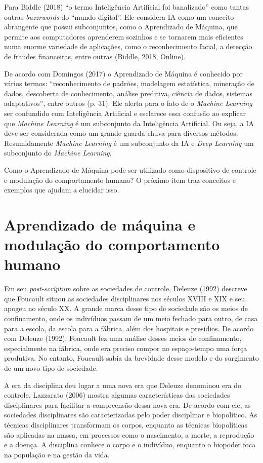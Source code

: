 Para Biddle (2018) ``o termo Inteligência Artificial foi banalizado''
como tantas outras \emph{buzzrwords} do ``mundo digital''. Ele considera
IA como um conceito abrangente que possui subconjuntos, como o
Aprendizado de Máquina, que permite aos computadores aprenderem sozinhos
e se tornarem mais eficientes numa enorme variedade de aplicações, como
o reconhecimento facial, a detecção de fraudes financeiras, entre outras
(Biddle, 2018, Online).

De acordo com Domingos (2017) o Aprendizado de Máquina é conhecido por
vários termos: ``reconhecimento de padrões, modelagem estatística,
mineração de dados, descoberta de conhecimento, análise preditiva,
ciência de dados, sistemas adaptativos'', entre outros (p. 31). Ele
alerta para o fato de o \emph{Machine Learning} ser confundido com
Inteligência Artificial e esclarece essa confusão ao explicar que
\emph{Machine Learning} é um subconjunto da Inteligência Artificial. Ou
seja, a IA deve ser considerada como um grande guarda-chuva para
diversos métodos. Resumidamente \emph{Machine Learning} é um subconjunto
da IA e \emph{Deep Learning} um subconjunto do \emph{Machine Learning}.

Como o Aprendizado de Máquina pode ser utilizado como dispositivo de
controle e modulação do comportamento humano? O próximo item traz
conceitos e exemplos que ajudam a elucidar isso.

\section{Aprendizado de máquina e modulação do comportamento humano}

Em seu \emph{post-scriptum} sobre as sociedades de controle, Deleuze
(1992) descreve que Foucault situou as sociedades disciplinares nos
séculos XVIII e XIX e seu apogeu no século XX. A grande marca desse tipo
de sociedade são os meios de confinamento, onde os indivíduos passam de
um meio fechado para outro, de casa para a escola, da escola para a
fábrica, além dos hospitais e presídios. De acordo com Deleuze (1992),
Foucault fez uma análise desses meios de confinamento, especialmente na
fábrica, onde era preciso compor no espaço-tempo uma força produtiva. No
entanto, Foucault sabia da brevidade desse modelo e do surgimento de um
novo tipo de sociedade.

A era da disciplina deu lugar a uma nova era que Deleuze denominou era
do controle. Lazzarato (2006) mostra algumas características das
sociedades disciplinares para facilitar a compreensão dessa nova era. De
acordo com ele, as sociedades disciplinares são caracterizadas pelo
poder disciplinar e biopolítico. As técnicas disciplinares transformam
os corpos, enquanto as técnicas biopolíticas são aplicadas na massa, em
processos como o nascimento, a morte, a reprodução e a doença. A
disciplina conhece o corpo e o indivíduo, enquanto o biopoder foca na
população e na gestão da vida.

